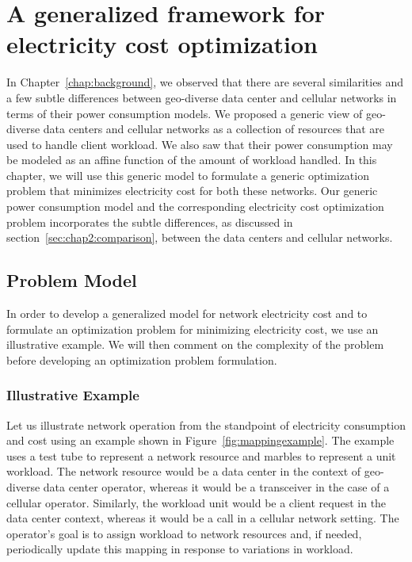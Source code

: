 \chapter{A generalized framework for electricity cost optimization}
\label{chap:framework} In Chapter~\ref{chap:background}, we observed that there are several similarities and a few subtle differences between geo-diverse data center and cellular networks in terms of their power consumption models. We proposed a generic view of geo-diverse data centers and cellular networks as a collection of resources that are used to handle client workload. We also saw that their power consumption may be modeled as an affine function of the amount of workload handled. In this chapter, we will use this generic model to formulate a generic optimization problem that minimizes electricity cost for both these networks. Our generic power consumption model and the corresponding electricity cost optimization problem incorporates the subtle differences, as discussed in section~\ref{sec:chap2:comparison}, between the data centers and cellular networks.


\section{Problem Model} %
In order to develop a generalized model for network electricity cost and to formulate an optimization problem for minimizing electricity cost, we use an illustrative example. We will then comment on the complexity of the problem before developing an optimization problem formulation.

\subsection{Illustrative Example}
\label{subsec:framework:example}
Let us illustrate network operation from the standpoint of electricity consumption and cost using an example shown in Figure~\ref{fig:mappingexample}. The example uses a test tube to represent a network resource and marbles to represent a unit workload. The network resource would be a data center in the context of geo-diverse data center operator, whereas it would be a transceiver in the case of a cellular operator. Similarly, the workload unit would be a client request in the data center context, whereas it would be a call in a cellular network setting. The operator's goal is to assign workload to network resources and, if needed, periodically update this mapping in response to variations in workload.

